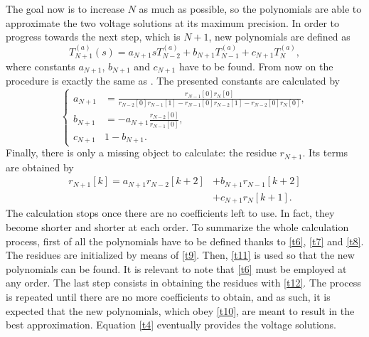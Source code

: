 \documentclass[journal]{IEEEtran}
\begin{document}
The goal now is to increase $N$ as much as possible, so the polynomials are able to approximate the two voltage solutions at its maximum precision. In order to progress towards the next step, which is $N+1$, new polynomials are defined as
\begin{equation}
  T^{(a)}_{N+1}(s)=a_{N+1}sT^{(a)}_{N-2}+b_{N+1}T^{(a)}_{N-1}+c_{N+1}T^{(a)}_N,
  \label{t10}
\end{equation}
where constants $a_{N+1}$, $b_{N+1}$ and $c_{N+1}$ have to be found. From now on the procedure is exactly the same as \cite{Trias2018}. The presented constants are calculated by
\begin{equation}
  \begin{cases}
    a_{N+1}&=\frac{r_{N-1}[0]r_N[0]}{r_{N-2}[0]r_{N-1}[1]-r_{N-1}[0]r_{N-2}[1]-r_{N-2}[0]r_N[0]},\\
    b_{N+1}&=-a_{N+1}\frac{r_{N-2}[0]}{r_{N-1}[0]},\\
    c_{N+1}&1-b_{N+1}.
  \end{cases}
  \label{t11}
\end{equation}
Finally, there is only a missing object to calculate: the residue $r_{N+1}$. Its terms are obtained by
\begin{equation}
  \begin{split}
    r_{N+1}[k]=a_{N+1}r_{N-2}[k+2]&+b_{N+1}r_{N-1}[k+2]\\
    &+c_{N+1}r_N[k+1].
  \end{split}
  \label{t12}
\end{equation}
The calculation stops once there are no coefficients left to use. In fact, they become shorter and shorter at each order. To summarize the whole calculation process, first of all the polynomials have to be defined thanks to \eqref{t6}, \eqref{t7} and \eqref{t8}. The residues are initialized by means of \eqref{t9}. Then, \eqref{t11} is used so that the new polynomials can be found. It is relevant to note that \eqref{t6} must be employed at any order. The last step consists in obtaining the residues with \eqref{t12}. The process is repeated until there are no more coefficients to obtain, and as such, it is expected that the new polynomials, which obey \eqref{t10}, are meant to result in the best approximation. Equation \eqref{t4} eventually provides the voltage solutions.
\end{document}
